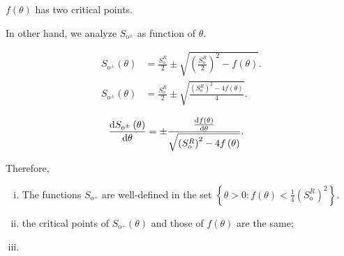 \documentclass[
    8pt,
    aspectratio=1610,
    c,
    intlimits,
    leqno,
    professionalfonts,
]{beamer}
\begin{document}
\begin{frame}
\begin{description}
		      $f\left(\theta\right)$ has two critical points.
	\end{description}
\end{frame}

\begin{frame}
	In other hand, we analyze $S_{\text{o}^{\pm}}$ as function of $\theta$.

	\begin{align*}
		S_{\text{o}^{\pm}}\left(\theta\right) & =
		\frac{S^{R}_{\text{o}}}{2}\pm
		\sqrt{\left(\frac{S^{R}_{\text{o}}}{2}\right)^{2}-f\left(\theta\right)}. \\
		S_{\text{o}^{\pm}}\left(\theta\right) & =
		\frac{S^{R}_{\text{o}}}{2}\pm
		\sqrt{\frac{\left(S^{R}_{\text{o}}\right)^{2}-4f\left(\theta\right)}{4}}.
	\end{align*}

	\begin{align*}
		\diff{S_{\text{o}^{\pm}}\left(\theta\right)}{\theta} & =
		\pm\frac{
			\diff{f\left(\theta\right)}{\theta}
		}{\sqrt{{\left(S^{R}_{\text{o}}\right)}^{2}-4f\left(\theta\right)}}.
	\end{align*}

	Therefore,
	\begin{enumerate}[i.]
		\item

		      The functions $S_{\text{o}^{+}}$ are well-defined in the set
		      \begin{math}
			      \left\{
			      \theta>0:
			      f\left(\theta\right)<\frac{1}{4}{\left(S^{R}_{\text{o}}\right)}^{2}
			      \right\}
		      \end{math}.

		\item

		      the critical points of $S_{\text{o}^{+}}\left(\theta\right)$
		      and those of $f\left(\theta\right)$ are the same;

		\item


\end{enumerate}
\end{frame}
\end{document}
